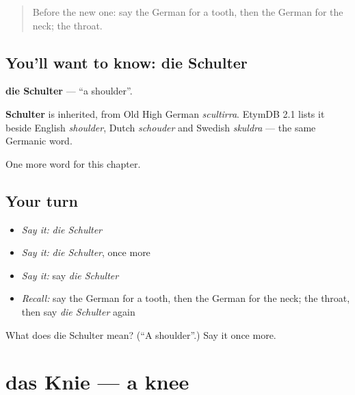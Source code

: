 \label{lesson:GE-C56-schulter}



\begin{quote}
Before the new one: say the German for a tooth, then the German for the neck; the throat.
\end{quote}

\subsection*{You'll want to know: die Schulter}
\textbf{die Schulter} — \textquotedblleft{}a shoulder\textquotedblright{}.

\begin{cousinweb}
\textbf{Schulter} is inherited, from Old High German \emph{scultirra}. EtymDB 2.1 lists it beside English \emph{shoulder}, Dutch \emph{schouder} and Swedish \emph{skuldra} — the same Germanic word.
\end{cousinweb}

\begin{grammarlens}[title={What you've built}]
One more word for this chapter.
\end{grammarlens}

\subsection*{Your turn}
\begin{itemize}
\raggedright
  \item \emph{Say it:} \emph{die Schulter}
  \item \emph{Say it:} \emph{die Schulter}, once more
  \item \emph{Say it:} say \emph{die Schulter}
  \item \emph{Recall:} say the German for a tooth, then the German for the neck; the throat, then say \emph{die Schulter} again
\end{itemize}

\begin{tcolorbox}[breakable,colback=teal!4,colframe=teal!35!black,title={Before you move on}]
What does die Schulter mean? (\textquotedblleft{}A shoulder\textquotedblright{}.) Say it once more.
\end{tcolorbox}
\section[das Knie]{das Knie — a knee}

\label{lesson:GE-C56-knie}




